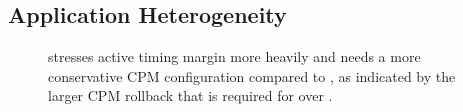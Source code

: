 
\subsection{Application Heterogeneity}
\label{sec:process:workload:heterogeneity}

\begin{figure}[t]
    \hfill
    \caption{ stresses active timing margin more heavily and needs a more conservative CPM configuration compared to , as indicated by the larger CPM rollback that is required for  over .}
    \label{fig:spec-limit-example} 
\end{figure}

